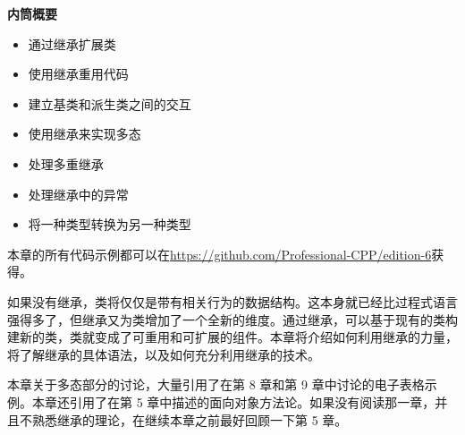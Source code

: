 \noindent
\textbf{内筒概要}

\begin{itemize}
\item
通过继承扩展类

\item
使用继承重用代码

\item
建立基类和派生类之间的交互

\item
使用继承来实现多态

\item
处理多重继承

\item
处理继承中的异常

\item
将一种类型转换为另一种类型
\end{itemize}

本章的所有代码示例都可以在\url{https://github.com/Professional-CPP/edition-6}获得。

如果没有继承，类将仅仅是带有相关行为的数据结构。这本身就已经比过程式语言强得多了，但继承又为类增加了一个全新的维度。通过继承，可以基于现有的类构建新的类，类就变成了可重用和可扩展的组件。本章将介绍如何利用继承的力量，将了解继承的具体语法，以及如何充分利用继承的技术。

本章关于多态部分的讨论，大量引用了在第 8 章和第 9 章中讨论的电子表格示例。本章还引用了在第 5 章中描述的面向对象方法论。如果没有阅读那一章，并且不熟悉继承的理论，在继续本章之前最好回顾一下第 5 章。






























